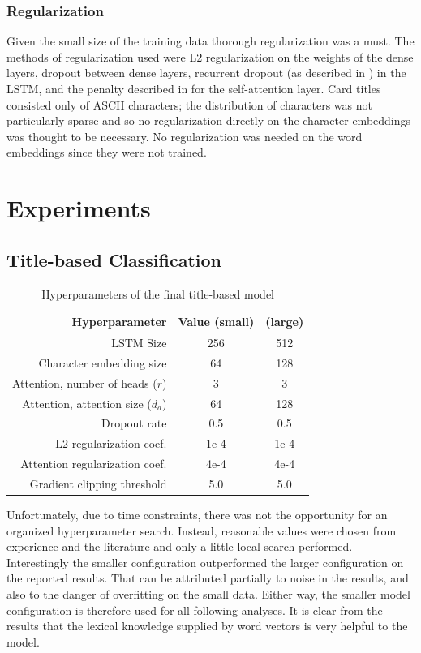 \documentclass[letterpaper]{article} %
\begin{document}
\subsubsection{Regularization}

Given the small size of the training data thorough regularization was a must.
The methods of regularization used were
L2 regularization on the weights of the dense layers,
dropout between dense layers,
recurrent dropout (as described in \cite{Gal2016ATG}) in the LSTM,
and the penalty described in \cite{Lin2017ASS} for the self-attention layer.
Card titles consisted only of ASCII characters;
the distribution of characters was not particularly sparse
and so no regularization directly on the character embeddings
was thought to be necessary.
No regularization was needed on the word embeddings since they were not trained.

\section{Experiments}


\subsection{Title-based Classification}

\begin{table}
  \centering
  \caption{Hyperparameters of the final title-based model}
  \begin{tabular}{r | c | c}
    Hyperparameter & Value (small) & (large) \\
    \hline
    LSTM Size & 256 & 512 \\
    Character embedding size & 64 & 128 \\
    Attention, number of heads ($r$) & 3 & 3\\
    Attention, attention size ($d_a$) & 64 & 128\\
    Dropout rate & 0.5 & 0.5 \\
    L2 regularization coef. & 1e-4 & 1e-4 \\
    Attention regularization coef. & 4e-4 & 4e-4 \\
    Gradient clipping threshold & 5.0 & 5.0 \\
  \end{tabular}
\end{table}

Unfortunately,
due to time constraints,
there was not the opportunity for an organized hyperparameter search.
Instead,
reasonable values were chosen from experience and the literature
and only a little local search performed.
Interestingly the smaller configuration outperformed the larger configuration
on the reported results.
That can be attributed partially to noise in the results,
and also to the danger of overfitting on the small data.
Either way,
the smaller model configuration is therefore used for all following analyses.
It is clear from the results that the lexical knowledge supplied by word vectors
is very helpful to the model.
\end{document}
